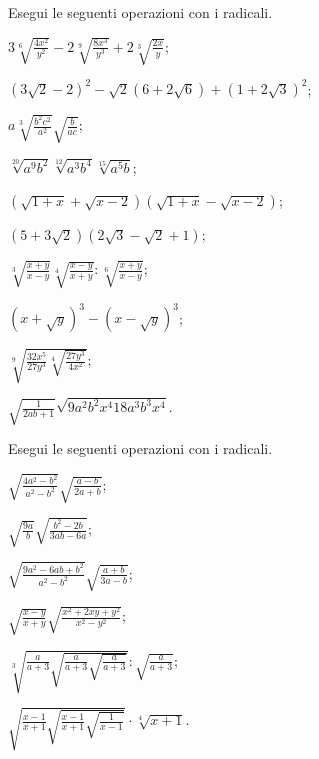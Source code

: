\begin{esercizio}[\Ast]
 \label{ese:2.77}
Esegui le seguenti operazioni con i radicali.
 \begin{multicols}{2}
 \begin{enumeratea}
 \item $3\sqrt[6]{\frac{4x^{2}}{y^{2}}}-2\sqrt[9]{\frac{8x^{3}}{y^{3}}}+2\sqrt[3]{\frac{2x}{y}}$;
 \item $(3\sqrt{2}-2)^{2}-\sqrt{2}(6+2\sqrt{6})+(1+2\sqrt{3})^{2}$;
 \item $a\sqrt[3]{\frac{b^{2}c^{2}}{a^{2}}}\sqrt{\frac{b}{ac}}$;
 \item $\sqrt[20]{a^{9}b^{2}}\sqrt[12]{a^{3}b^{4}}\sqrt[15]{a^{5}b}$;
 \item $\left(\sqrt{1+x}+\sqrt{x-2}\right)\left(\sqrt{1+x}-\sqrt{x-2}\right)$;
 \item $\left(5+3\sqrt{2}\right)\left(2\sqrt{3}-\sqrt{2}+1\right)$;
 \item $\sqrt[3]{\frac{x+y}{x-y}}\sqrt[4]{\frac{x-y}{x+y}}:\sqrt[6]{\frac{x+y}{x-y}}$;
 \item $\left(x+\sqrt{y}\right)^{3}-\left(x-\sqrt{y}\right)^{3}$;
 \item $\sqrt[9]{\frac{32x^{5}}{27y^{3}}\sqrt[4]{\frac{27y^{3}}{4x^{2}}}}$;
 \item $\sqrt{\frac{1}{2ab+1}}\sqrt{9a^{2}b^{2}x^{4}18a^{3}b^{3}x^{4}}$.
 \end{enumeratea}
 \end{multicols}
\end{esercizio}

\begin{esercizio}[\Ast]
 \label{ese:2.78}
Esegui le seguenti operazioni con i radicali.
 \begin{multicols}{2}
 \begin{enumeratea}
 \item $\sqrt{\frac{4a^2-b^2}{a^2-b^2}}\sqrt{\frac{a-b}{2a+b}}$;
 \item $\sqrt{\frac {9a}{b}}\sqrt{\frac{b^2-2b}{3ab-6a}}$;
 \item $\sqrt{\frac{9a^2-6ab+b^2}{a^2-b^2}}\sqrt{\frac{a+b}{3a-b}}$;
 \item $\sqrt{\frac{x-y}{x+y}}\sqrt{\frac{x^2+2xy+y^2}{x^2-y^2}}$;
 \item $\sqrt[3]{\frac a{a+3}\sqrt{\frac a{a+3}\sqrt{\frac a{a+3}}}}:\sqrt{\frac a{a+3}}$;
 \item $\sqrt{\frac{x-1}{x+1}\sqrt{\frac{x-1}{x+1}\sqrt{\frac 1{x-1}}}}\cdot \sqrt[4]{x+1}$.
 \end{enumeratea}
 \end{multicols}
\end{esercizio}

